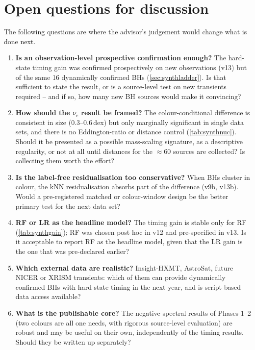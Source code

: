 \chapter{Open questions for discussion}\label{ch:questions}
The following questions are where the advisor's judgement would change what is done next.

\begin{enumerate}[leftmargin=*,itemsep=0.6em]
\item \textbf{Is an observation-level prospective confirmation enough?} The hard-state timing gain was confirmed prospectively on new
observations (v13) but of the same 16 dynamically confirmed BHs (\cref{sec:synthladder}). Is that sufficient to state the result, or is a
source-level test on new transients required -- and if so, how many new BH sources would make it convincing?

\item \textbf{How should the $\nu_c$ result be framed?} The colour-conditional difference is consistent in size (0.3--0.6\,dex) but only
marginally significant in single data sets, and there is no Eddington-ratio or distance control (\cref{tab:synthnuc}). Should it be presented
as a possible mass-scaling signature, as a descriptive regularity, or not at all until distances for the $\approx60$ sources are collected?
Is collecting them worth the effort?

\item \textbf{Is the label-free residualisation too conservative?} When BHs cluster in colour, the kNN residualisation absorbs part of the
difference (v9b, v13b). Would a pre-registered matched or colour-window design be the better primary test for the next data set?

\item \textbf{RF or LR as the headline model?} The timing gain is stable only for RF (\cref{tab:synthgain}); RF was chosen post hoc in v12 and
pre-specified in v13. Is it acceptable to report RF as the headline model, given that the LR gain is the one that was pre-declared earlier?

\item \textbf{Which external data are realistic?} Insight-HXMT, AstroSat, future NICER or XRISM transients: which of them can provide
dynamically confirmed BHs with hard-state timing in the next year, and is script-based data access available?

\item \textbf{What is the publishable core?} The negative spectral results of Phases 1--2 (two colours are all one needs, with rigorous
source-level evaluation) are robust and may be useful on their own, independently of the timing results. Should they be written up
separately?
\end{enumerate}
